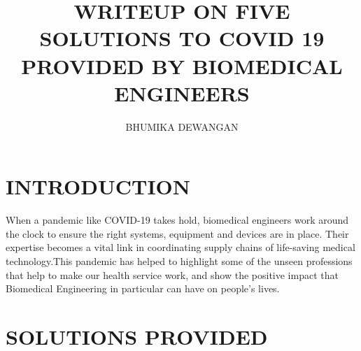 \documentclass[12 pt]{report}
\title{WRITEUP ON FIVE SOLUTIONS TO COVID 19 PROVIDED BY BIOMEDICAL ENGINEERS}
\author{BHUMIKA DEWANGAN}
\date{}
\begin{document}
\maketitle
\section{INTRODUCTION}
When a pandemic like COVID-19 takes hold, biomedical engineers work around the clock to ensure the right systems, equipment and devices are in place. Their expertise becomes a vital link in coordinating supply chains of life-saving medical technology.This pandemic has helped to highlight some of the unseen professions that help to make our health service work, and show the positive impact that Biomedical Engineering in particular can have on people’s lives.
\section{SOLUTIONS PROVIDED }
\end{document}
